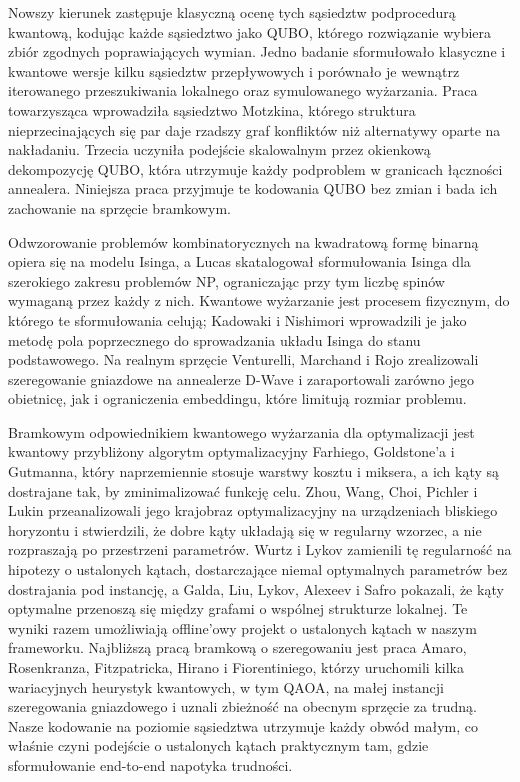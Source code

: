 \documentclass[11pt,a4paper]{article}
\begin{document}
Nowszy kierunek zastępuje klasyczną ocenę tych sąsiedztw podprocedurą
kwantową, kodując każde sąsiedztwo jako QUBO, którego rozwiązanie wybiera
zbiór zgodnych poprawiających wymian. Jedno badanie sformułowało klasyczne
i kwantowe wersje kilku sąsiedztw przepływowych i porównało je wewnątrz
iterowanego przeszukiwania lokalnego oraz symulowanego wyżarzania. Praca
towarzysząca wprowadziła sąsiedztwo Motzkina, którego struktura
nieprzecinających się par daje rzadszy graf konfliktów niż alternatywy oparte
na nakładaniu. Trzecia uczyniła podejście skalowalnym przez okienkową
dekompozycję QUBO, która utrzymuje każdy podproblem w granicach łączności
annealera. Niniejsza praca przyjmuje te kodowania QUBO bez zmian i bada ich
zachowanie na sprzęcie bramkowym.

Odwzorowanie problemów kombinatorycznych na kwadratową formę binarną opiera
się na modelu Isinga, a Lucas skatalogował sformułowania Isinga dla szerokiego
zakresu problemów NP, ograniczając przy tym liczbę spinów wymaganą przez
każdy z nich. Kwantowe wyżarzanie jest procesem fizycznym, do którego te
sformułowania celują; Kadowaki i Nishimori wprowadzili je jako metodę pola
poprzecznego do sprowadzania układu Isinga do stanu podstawowego. Na realnym
sprzęcie Venturelli, Marchand i Rojo zrealizowali szeregowanie gniazdowe na
annealerze D-Wave i zaraportowali zarówno jego obietnicę, jak i ograniczenia
embeddingu, które limitują rozmiar problemu.

Bramkowym odpowiednikiem kwantowego wyżarzania dla optymalizacji jest kwantowy
przybliżony algorytm optymalizacyjny Farhiego, Goldstone'a i Gutmanna, który
naprzemiennie stosuje warstwy kosztu i miksera, a ich kąty są dostrajane tak,
by zminimalizować funkcję celu. Zhou, Wang, Choi, Pichler i Lukin
przeanalizowali jego krajobraz optymalizacyjny na urządzeniach bliskiego
horyzontu i stwierdzili, że dobre kąty układają się w regularny wzorzec,
a nie rozpraszają po przestrzeni parametrów. Wurtz i Lykov zamienili tę
regularność na hipotezy o ustalonych kątach, dostarczające niemal optymalnych
parametrów bez dostrajania pod instancję, a Galda, Liu, Lykov, Alexeev i Safro
pokazali, że kąty optymalne przenoszą się między grafami o wspólnej strukturze
lokalnej. Te wyniki razem umożliwiają offline'owy projekt o ustalonych kątach
w naszym frameworku. Najbliższą pracą bramkową o szeregowaniu jest praca
Amaro, Rosenkranza, Fitzpatricka, Hirano i Fiorentiniego, którzy uruchomili
kilka wariacyjnych heurystyk kwantowych, w tym QAOA, na małej instancji
szeregowania gniazdowego i uznali zbieżność na obecnym sprzęcie za trudną.
Nasze kodowanie na poziomie sąsiedztwa utrzymuje każdy obwód małym, co
właśnie czyni podejście o ustalonych kątach praktycznym tam, gdzie
sformułowanie end-to-end napotyka trudności.
\end{document}
